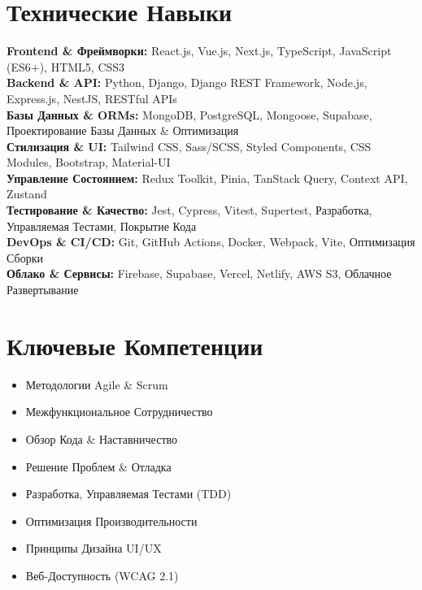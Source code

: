 \documentclass[10pt,a4paper]{article}
\begin{document}
\section*{Технические Навыки}

\noindent
\textbf{\color{darkgray}Frontend \& Фреймворки:} React.js, Vue.js, Next.js, TypeScript, JavaScript (ES6+), HTML5, CSS3 \\
\textbf{\color{darkgray}Backend \& API:} Python, Django, Django REST Framework, Node.js, Express.js, NestJS, RESTful APIs \\
\textbf{\color{darkgray}Базы Данных \& ORMs:} MongoDB, PostgreSQL, Mongoose, Supabase, Проектирование Базы Данных \& Оптимизация \\
\textbf{\color{darkgray}Стилизация \& UI:} Tailwind CSS, Sass/SCSS, Styled Components, CSS Modules, Bootstrap, Material-UI \\
\textbf{\color{darkgray}Управление Состоянием:} Redux Toolkit, Pinia, TanStack Query, Context API, Zustand \\
\textbf{\color{darkgray}Тестирование \& Качество:} Jest, Cypress, Vitest, Supertest, Разработка, Управляемая Тестами, Покрытие Кода \\
\textbf{\color{darkgray}DevOps \& CI/CD:} Git, GitHub Actions, Docker, Webpack, Vite, Оптимизация Сборки \\
\textbf{\color{darkgray}Облако \& Сервисы:} Firebase, Supabase, Vercel, Netlify, AWS S3, Облачное Развертывание

\section*{Ключевые Компетенции}

\noindent
\begin{minipage}[t]{0.48\textwidth}
  \begin{itemize}
    \item Методологии Agile \& Scrum
    \item Межфункциональное Сотрудничество
    \item Обзор Кода \& Наставничество
    \item Решение Проблем \& Отладка
  \end{itemize}
\end{minipage}%
\hfill
\begin{minipage}[t]{0.48\textwidth}
  \begin{itemize}
    \item Разработка, Управляемая Тестами (TDD)
    \item Оптимизация Производительности
    \item Принципы Дизайна UI/UX
    \item Веб-Доступность (WCAG 2.1)
  \end{itemize}
\end{minipage}
\end{document}
